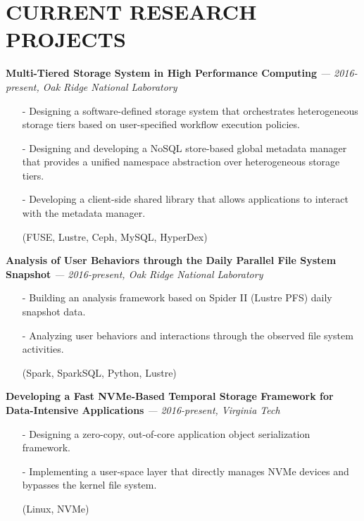 \section{CURRENT RESEARCH PROJECTS}
\vspace{.03in}
  {\bf Multi-Tiered Storage System in High Performance Computing}
   {\it \footnotesize --- 2016-present, Oak Ridge National Laboratory}
   \begin{itemize}[leftmargin=*]
    \setlength\itemsep{-0.02in}
    \item[-] Designing a software-defined storage system that orchestrates
	     heterogeneous storage tiers based on user-specified workflow execution
             policies.
    \item[-] Designing and developing a NoSQL store-based global metadata manager
	     that provides a unified namespace abstraction over heterogeneous
	     storage tiers.
    \item[-] Developing a client-side shared library that allows applications to interact
             with the metadata manager.
    \item[] {\small(FUSE, Lustre, Ceph, MySQL, HyperDex)}
   \end{itemize}
  \vspace{-0.15in}
  {\bf Analysis of User Behaviors through the Daily Parallel File System Snapshot}
   {\it \footnotesize --- 2016-present, Oak Ridge National Laboratory}
   \begin{itemize}[leftmargin=*]
    \setlength\itemsep{-0.02in}
    \item[-] Building an analysis framework based on Spider II (Lustre PFS) daily snapshot data.
    \item[-] Analyzing user behaviors and interactions through the observed file system activities.
    \item[] {\small(Spark, SparkSQL, Python, Lustre)}
   \end{itemize}
  \vspace{-0.15in}
  {\bf Developing a Fast NVMe-Based Temporal Storage Framework for Data-Intensive Applications}
   {\it \footnotesize --- 2016-present, Virginia Tech}
   \begin{itemize}[leftmargin=*]
    \setlength\itemsep{-0.02in}
    \item[-] Designing a zero-copy, out-of-core application object serialization framework.
    \item[-] Implementing a user-space layer that directly manages NVMe
             devices and bypasses the kernel file system.
    \item[] {\small(Linux, NVMe)}
   \end{itemize}
 

